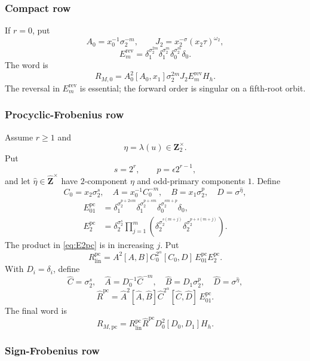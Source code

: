 \documentclass[11pt,reqno]{amsart}
\theoremstyle{definition}
\theoremstyle{remark}
\numberwithin{equation}{section}
\newcommand{\Z}{\mathbf Z}
\newcommand{\pc}{\mathrm{pc}}
\newcommand{\whZ}{\widehat{\Z}}
\begin{document}
\subsubsection{Compact row}

If \(r=0\), put
\[
 A_0=x_0^{-1}\sigma_2^{-m},\qquad
 J_2=x_2^{-\sigma}(x_2\tau)^{\omega_2},
\]
\[
 E_m^{\mathrm{rev}}
 =\delta_1^{\sigma_2^{2m}}
  \delta_1^{\sigma_2^m}
  \delta_0^{\sigma_2^m}
  \delta_0.
\]
The word is
\begin{equation}\label{eq:Mcompact-word}
 R_{M,0}
 =A_0^2[A_0,x_1]\sigma_2^{2m}
 J_2E_m^{\mathrm{rev}}H_h.
\end{equation}
The reversal in \(E_m^{\mathrm{rev}}\) is essential; the forward order is
singular on a fifth-root orbit.

\subsubsection{Procyclic-Frobenius row}

Assume \(r\ge1\) and
\[
 \eta=\lambda(u)\in\Z_2^\times.
\]
Put
\[
 s=2^r,\qquad p=\epsilon2^{r-1},
\]
and let \(\widehat\eta\in\whZ^\times\) have \(2\)-component \(\eta\)
and odd-primary components \(1\).  Define
\[
 C_0=x_2\sigma_2^s,\quad
 A=x_0^{-1}C_0^{-m},\quad
 B=x_1\sigma_2^p,\quad
 D=\sigma^{\widehat\eta},
\]
\begin{align}
 E_{01}^{\pc}
 &=
 \delta_1^{\sigma_2^{p+2sm}}
 \delta_1^{\sigma_2^{p+sm}}
 \delta_0^{\sigma_2^{sm+p}}
 \delta_0,\label{eq:E01pc}\\
 E_2^{\pc}
 &=
 \delta_2^{\sigma_2^s}
 \prod_{j=1}^{m}
 \left(
 \delta_2^{\sigma_2^{s(m+j)}}
 \delta_2^{\sigma_2^{p+s(m+j)}}
 \right).\label{eq:E2pc}
\end{align}
The product in \eqref{eq:E2pc} is in increasing \(j\).  Put
\[
 R_{\mathrm{lin}}^{\pc}
 =A^2[A,B]C_0^{2^\alpha}[C_0,D]\,
 E_{01}^{\pc}E_2^{\pc}.
\]
With \(D_i=\delta_i\), define
\[
 \widehat C=\sigma_2^s,\quad
 \widehat A=D_0^{-1}\widehat C^{-m},\quad
 \widehat B=D_1\sigma_2^p,\quad
 \widehat D=\sigma^{\widehat\eta},
\]
\[
 \widehat R^{\pc}
 =
 \widehat A^2[\widehat A,\widehat B]
 \widehat C^{2^\alpha}[\widehat C,\widehat D]\,
 E_{01}^{\pc}.
\]
The final word is
\begin{equation}\label{eq:Mpc-word}
 R_{M,\pc}
 =R_{\mathrm{lin}}^{\pc}\widehat R^{\pc}
 D_0^2[D_0,D_1]H_h.
\end{equation}

\subsubsection{Sign-Frobenius row}
\end{document}
